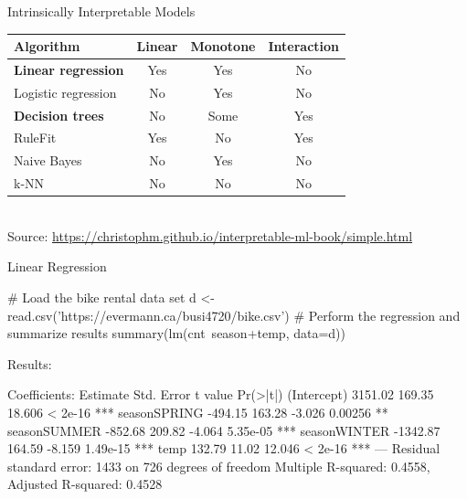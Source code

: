 \documentclass[ignorenonframetext,xcolor=x11names]{beamer}
\begin{document}

\begin{frame}{Intrinsically Interpretable Models}

\centering
\renewcommand{\arraystretch}{1.1}

\begin{tabular}{lccc} \hline
Algorithm & Linear & Monotone & Interaction \\ \hline
\textbf{Linear regression} & Yes & Yes & No  \\ 
Logistic regression & No & Yes & No  \\
\textbf{Decision trees} & No & Some & Yes  \\
RuleFit & Yes & No & Yes  \\
Naive Bayes & No & Yes & No \\
k-NN & No & No & No  \\ \hline
\end{tabular} \\

\scriptsize Source: \url{https://christophm.github.io/interpretable-ml-book/simple.html}\normalsize
\end{frame}

\begin{frame}[fragile]{Linear Regression}
\begin{Rcode}
# Load the bike rental data set
d <- read.csv('https://evermann.ca/busi4720/bike.csv')
# Perform the regression and summarize results
summary(lm(cnt~season+temp, data=d))
\end{Rcode}
Results:
\begin{textcode}
Coefficients:
             Estimate Std. Error t value Pr(>|t|)    
(Intercept)   3151.02     169.35  18.606  < 2e-16 ***
seasonSPRING  -494.15     163.28  -3.026  0.00256 ** 
seasonSUMMER  -852.68     209.82  -4.064 5.35e-05 ***
seasonWINTER -1342.87     164.59  -8.159 1.49e-15 ***
temp           132.79      11.02  12.046  < 2e-16 ***
---
Residual standard error: 1433 on 726 degrees of freedom
Multiple R-squared: 0.4558, Adjusted R-squared: 0.4528 
\end{textcode}
\end{frame}
\end{document}

